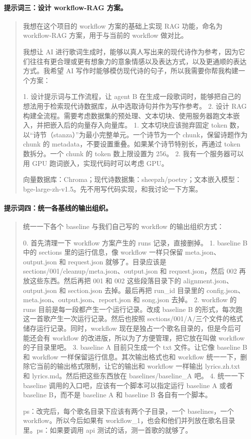 \documentclass[12pt, a4paper]{ctexart}
\numberwithin{table}{section}
\numberwithin{figure}{section}
\begin{document}
\paragraph{提示词三：设计 workflow-RAG 方案。}
\begin{quote}\small
我想在这个项目的 workflow 方案的基础上实现 RAG 功能，命名为 workflow-RAG 方案，用于与当前的 workflow 做对比。

我想让 AI 进行歌词生成时，能够以真人写出来的现代诗作为参考，因为它们往往有更合理或更有想象力的意象情感以及表达方式，以及更通顺的表达方式。我希望 AI 写作时能够模仿现代诗的句子，所以我需要你帮我构建一个方案：

1. 设计提示词与工作流程，让 agent B 在生成一段歌词时，能够把自己的想法用于检索现代诗数据库，从中选取诗句并作为写作参考。
2. 设计 RAG 构建全流程。需要考虑数据集的预处理、文本切块、使用服务器跑文本嵌入，并把嵌入后的向量存入向量库。
   1. 文本切块应该抛弃固定 token 数，以“诗节（stanza）”为最小完整单元。一个诗节为一个 chunk，保留诗题作为 chunk 的 metadata，不要设置重叠。如果某个诗节特别长，再通过 token 数拆分。一个 chunk 的 token 数上限设置为 256。
   2. 我有一个服务器可以用 GPU 跑词嵌入，实现代码时可以考虑 GPU。

向量数据库：Chroma；现代诗数据集：sheepzh/poetry；文本嵌入模型：bge-large-zh-v1.5。先不用写代码实现，和我讨论一下方案。
\end{quote}

\paragraph{提示词四：统一各基线的输出组织。}
\begin{quote}\small
统一一下各个 baseline 与我们自己写的 workflow 的输出组织方式：

0. 首先清理一下 workflow 方案产生的 runs 记录，直接删掉。
1. baseline B 中的 sections 里的运行信息，像 workflow 一样只保留 meta.json、output.json 和 request.json 就够了。目录应该是 sections/001/cleanup/meta.json、output.json 和 request.json，然后 002 再放这些东西。然后再把 001 和 002 这些段落目录下的 alignment.json、output.json 和 section.json 去掉。最后再把 run\_id 目录里的 config.json、meta.json、output.json、report.json 和 song.json 去掉。
2. workflow 的 runs 目前是每一段都产生一个运行记录。改成 baseline B 的形式，每次跑这一首歌产生一次运行记录。然后也按照 sections/001/A/三个文件的格式储存运行记录。同时，workflow 现在是独占一个歌名目录的，但是今后可能还会有 workflow 的改进版，所以为了方便管理，把它放在叫做 workflow 的子目录里吧。
3. baseline A 目前只生成一个 txt 文件。让它像 baseline B 和 workflow 一样保留运行信息。其次输出格式也和 workflow 统一一下，删除它当前的输出格式限制，让它的输出和 workflow 一样输出 lyrics.zh.txt 和 lyrics.md。然后把这些东西放在 baselines/baseline\_A 吧。
4. 统一一下 baseline 调用的入口吧，应该有一个脚本可以指定运行 baseline A 或者 baseline B，而不是 baseline A 和 baseline B 各自有一个脚本。

ps：改完后，每个歌名目录下应该有两个子目录，一个 baselines，一个 workflow。所以今后如果有 workflow\_1，也会和他们并列放在歌名目录里。ps：如果要调用 api 测试的话，测一首歌的就够了。
\end{quote}
\end{document}
